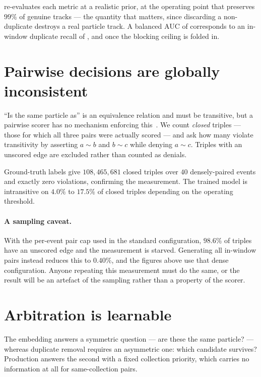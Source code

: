 \documentclass[11pt]{article}
\begin{document}
 re-evaluates each metric at a realistic prior, at the
operating point that preserves $99\%$ of genuine tracks --- the quantity that
matters, since discarding a non-duplicate destroys a real particle track. A
balanced AUC of \AucEucl{} corresponds to an in-window duplicate recall of
\RecallDeploy{}, and \RecallEndToEnd{} once the blocking ceiling is folded in.

\section{Pairwise decisions are globally inconsistent}
\label{sec:transitivity}

``Is the same particle as'' is an equivalence relation and must be transitive, but
a pairwise scorer has no mechanism enforcing this~\cite{binette2020}. We count
\emph{closed} triples --- those for which all three pairs were actually scored ---
and ask how many violate transitivity by asserting $a\sim b$ and $b\sim c$ while
denying $a\sim c$. Triples with an unscored edge are excluded rather than counted
as denials.

Ground-truth labels give $108{,}465{,}681$ closed triples over $40$ densely-paired
events and exactly zero violations, confirming the measurement. The trained model
is intransitive on $4.0\%$ to $17.5\%$ of closed triples depending on the
operating threshold.

\paragraph{A sampling caveat.} With the per-event pair cap used in the standard
configuration, $98.6\%$ of triples have an unscored edge and the measurement is
starved. Generating all in-window pairs instead reduces this to $0.40\%$, and the
figures above use that dense configuration. Anyone repeating this measurement
must do the same, or the result will be an artefact of the sampling rather than a
property of the scorer.

\section{Arbitration is learnable}
\label{sec:arbitration}

The embedding answers a symmetric question --- are these the same particle? ---
whereas duplicate removal requires an asymmetric one: which candidate survives?
Production answers the second with a fixed collection priority, which carries no
information at all for same-collection pairs.
\end{document}
